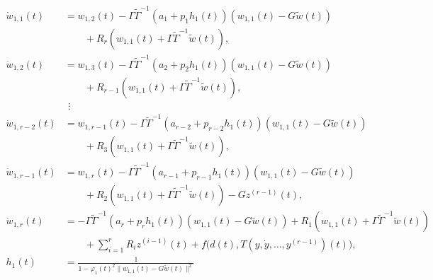 \documentclass[ envcountsect, envcountsame]{svjour3}
\newcommand{\vp}{\varphi}
\begin{document}
\begin{subequations} \label{eq:ddt_w}
\begin{equation} \label{eq:ddt_w1}
\begin{aligned}
\dot w_{1,1}(t) &= w_{1,2}(t) - \Gamma \tilde \Gamma^{-1} ( a_1 + p_1 h_1(t)) (w_{1,1}(t) - G \tilde w(t)) \\
& \qquad + R_{r} (w_{1,1}(t) + \Gamma  \tilde \Gamma^{-1}\tilde w(t) ) , \\
\dot w_{1,2}(t) &= w_{1,3}(t) - \Gamma \tilde \Gamma^{-1} ( a_2 + p_2 h_1(t)) (w_{1,1}(t) - G \tilde w(t))\\
& \qquad + R_{r-1}(w_{1,1}(t) + \Gamma  \tilde \Gamma^{-1}\tilde w(t) ) , \\
 & \ \, \vdots \\
\dot w_{1,r-2}(t) &= w_{1,r-1}(t) - \Gamma \tilde \Gamma^{-1} ( a_{r-2} + p_{r-2} h_1(t)) (w_{1,1}(t) - G \tilde w(t)) \\
& \qquad + R_{3} (w_{1,1}(t) + \Gamma  \tilde \Gamma^{-1}\tilde w(t) ) , \\
\dot w_{1,r-1}(t) &= w_{1,r}(t) - \Gamma \tilde \Gamma^{-1} ( a_{r-1} + p_{r-1} h_1(t)) (w_{1,1}(t) - G \tilde w(t)) \\
& \qquad + R_{2} (w_{1,1}(t) + \Gamma  \tilde \Gamma^{-1}\tilde w(t) ) - G z^{(r-1)}(t) , \\
\dot w_{1,r}(t) &=   -\Gamma \tilde \Gamma^{-1} ( a_{r} + p_{r} h_1(t)) (w_{1,1}(t) - G \tilde w(t)) + R_{1} (w_{1,1}(t) + \Gamma  \tilde \Gamma^{-1}\tilde w(t) ) \\
 & \qquad + \sum_{i=1}^{r}R_i z^{(i-1)}(t) + f\big(d(t),T(y,\dot y,\ldots,y^{(r-1)})(t) \big) ,
\ \\
h_1(t) &= \frac{1}{1-\vp_1(t)^2 \|w_{1,1}(t) - G \tilde w(t) \|^2} \\
\end{aligned}
%
%

\end{equation}
\end{subequations}
\end{document}
